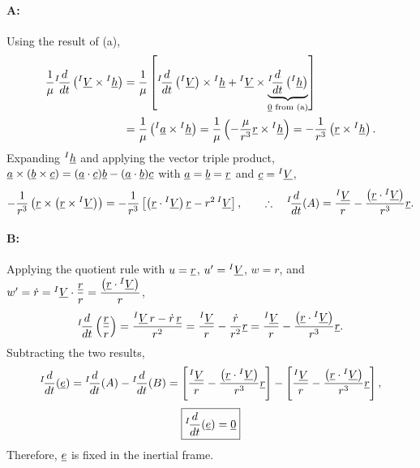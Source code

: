 \paragraph{A:} Using the result of (a),
\begin{equation}
\begin{aligned}
\frac{1}{\mu}{}^{I}\!\frac{d}{dt}\left({}^{I}\underline{V}\times{}^{I}\underline{h}\right) &= \frac{1}{\mu}\left[{}^{I}\!\frac{d}{dt}\left({}^{I}\underline{V}\right)\times{}^{I}\underline{h} + {}^{I}\underline{V}\times\underbrace{{}^{I}\!\frac{d}{dt}\left({}^{I}\underline{h}\right)}_{\underline{0}\text{ from (a)}}\right] \\
&= \frac{1}{\mu}\left({}^{I}\underline{a}\times{}^{I}\underline{h}\right)
= \frac{1}{\mu}\left(-\frac{\mu}{r^3}\underline{r}\times{}^{I}\underline{h}\right) = -\frac{1}{r^3}\left(\underline{r}\times{}^{I}\underline{h}\right).
\end{aligned}
\end{equation}
Expanding ${}^{I}\underline{h}$ and applying the vector triple product, $\underline{a}\times(\underline{b}\times\underline{c}) = (\underline{a}\cdot\underline{c})\underline{b} - (\underline{a}\cdot\underline{b})\underline{c}$ with $\underline{a}=\underline{b}=\underline{r}$ and $\underline{c}={}^{I}\underline{V}$,
\begin{equation}
-\frac{1}{r^3}\left(\underline{r}\times\left(\underline{r}\times{}^{I}\underline{V}\right)\right)
= -\frac{1}{r^3}\left[\left(\underline{r}\cdot{}^{I}\underline{V}\right)\underline{r} - r^2\,{}^{I}\underline{V}\right],
\qquad
\therefore\quad {}^{I}\!\frac{d}{dt}(A) = \frac{{}^{I}\underline{V}}{r} - \frac{\left(\underline{r}\cdot{}^{I}\underline{V}\right)}{r^3}\underline{r}.
\end{equation}

\paragraph{B:} Applying the quotient rule with $u=\underline{r}$, $u'={}^{I}\underline{V}$, $w=r$, and $w'=\dot r = {}^{I}\underline{V}\cdot\dfrac{\underline{r}}{r} = \dfrac{\left(\underline{r}\cdot{}^{I}\underline{V}\right)}{r}$,
\begin{equation}
{}^{I}\!\frac{d}{dt}\left(\frac{\underline{r}}{r}\right) = \frac{{}^{I}\underline{V}\,r - \dot r\,\underline{r}}{r^2}
= \frac{{}^{I}\underline{V}}{r} - \frac{\dot r}{r^2}\underline{r}
= \frac{{}^{I}\underline{V}}{r} - \frac{\left(\underline{r}\cdot{}^{I}\underline{V}\right)}{r^3}\underline{r}.
\end{equation}
Subtracting the two results,
\begin{equation}
{}^{I}\!\frac{d}{dt}(\underline{e}) = {}^{I}\!\frac{d}{dt}(A) - {}^{I}\!\frac{d}{dt}(B)
= \left[\frac{{}^{I}\underline{V}}{r} - \frac{\left(\underline{r}\cdot{}^{I}\underline{V}\right)}{r^3}\underline{r}\right]
- \left[\frac{{}^{I}\underline{V}}{r} - \frac{\left(\underline{r}\cdot{}^{I}\underline{V}\right)}{r^3}\underline{r}\right],
\end{equation}
\begin{equation}
\boxed{{}^{I}\!\frac{d}{dt}(\underline{e}) = \underline{0}}
\end{equation}
Therefore, $\underline{e}$ is fixed in the inertial frame.

